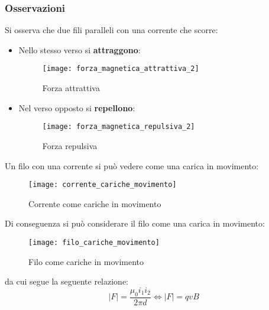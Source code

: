 \documentclass[a4paper]{article}
\begin{document}
\subsubsection{Osservazioni}
Si osserva che due fili paralleli con una corrente che scorre:
\begin{itemize}
  \item Nello stesso verso si \textbf{attraggono}:
    \begin{figure}[H]
      \centering
      \texttt{[image: forza\_magnetica\_attrattiva\_2]}
      \caption{Forza attrattiva}
    \end{figure}

  \item Nel verso opposto si \textbf{repellono}:
    \begin{figure}[H]
      \centering
      \texttt{[image: forza\_magnetica\_repulsiva\_2]}
      \caption{Forza repulsiva}
    \end{figure}
\end{itemize}
Un filo con una corrente si può vedere come una carica in movimento:
\begin{figure}[H]
  \centering
  \texttt{[image: corrente\_cariche\_movimento]}
  \caption{Corrente come cariche in movimento}
\end{figure}
\noindent
Di conseguenza si può considerare il filo come una carica in movimento:
\begin{figure}[H]
  \centering
  \texttt{[image: filo\_cariche\_movimento]}
  \caption{Filo come cariche in movimento}
\end{figure}
\noindent
da cui segue la seguente relazione:
\[
  |F| = \frac{\mu_0 i_1 i_2}{2 \pi d} \Leftrightarrow |F| = qvB
\] 
\end{document}
